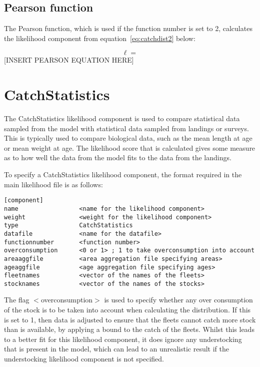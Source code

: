 \documentclass [a4paper, 10pt]{book}
\begin{document}
\subsection{Pearson function}
The Pearson function, which is used if the function number is set to 2, calculates the likelihood component from equation~\ref{eq:catchdist2} below:

\begin{equation}\label{eq:catchdist2}
\ell = 
\end{equation}
[INSERT PEARSON EQUATION HERE]

\section{CatchStatistics}\label{sec:catchstat}
The CatchStatistics likelihood component is used to compare statistical data sampled from the model with statistical data sampled from landings or surveys.  This is typically used to compare biological data, such as the mean length at age or mean weight at age.  The likelihood score that is calculated gives some measure as to how well the data from the model fits to the data from the landings.

\bigskip
To specify a CatchStatistics likelihood component, the format required in the main likelihood file is as follows:

\begin{verbatim}
[component]
name                 <name for the likelihood component>
weight               <weight for the likelihood component>
type                 CatchStatistics
datafile             <name for the datafile>
functionnumber       <function number>
overconsumption      <0 or 1> ; 1 to take overconsumption into account
areaaggfile          <area aggregation file specifying areas>
ageaggfile           <age aggregation file specifying ages>
fleetnames           <vector of the names of the fleets>
stocknames           <vector of the names of the stocks>
\end{verbatim}

The flag $<$overconsumption$>$ is used to specify whether any over consumption of the stock is to be taken into account when calculating the distribution.  If this is set to 1, then data is adjusted to ensure that the fleets cannot catch more stock than is available, by applying a bound to the catch of the fleets.  Whilst this leads to a better fit for this likelihood component, it does ignore any understocking that is present in the model, which can lead to an unrealistic result if the understocking likelihood component is not specified.
\end{document}
